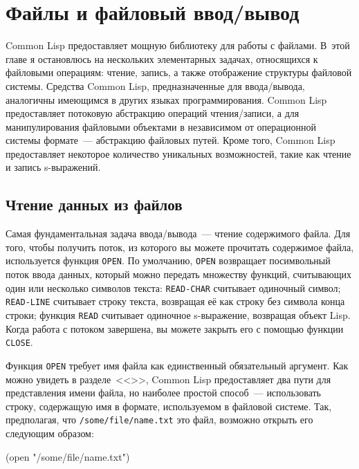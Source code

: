 \chapter{Файлы и файловый ввод/вывод}
\label{ch:14}

\thispagestyle{empty}

Common Lisp предоставляет мощную библиотеку для работы с файлами. В~этой главе я
остановлюсь на нескольких элементарных задачах, относящихся к файловыми операциям: чтение,
запись, а также отображение структуры файловой системы. Средства Common Lisp,
предназначенные для ввода/вывода, аналогичны имеющимся в других языках
программирования. Common Lisp предоставляет потоковую абстракцию операций чтения/записи, а
для манипулирования файловыми объектами в независимом от операционной системы формате~---
абстракцию файловых путей. Кроме того, Common Lisp предоставляет некоторое
количество уникальных возможностей, такие как чтение и запись s-выражений.

\section{Чтение данных из файлов}

Самая фундаментальная задача ввода/вывода~--- чтение содержимого файла. Для того, чтобы
получить поток, из которого вы можете прочитать содержимое файла, используется функция
\lstinline{OPEN}. По умолчанию, \lstinline{OPEN} возвращает посимвольный поток ввода данных, который
можно передать множеству функций, считывающих один или несколько символов текста:
\lstinline{READ-CHAR} считывает одиночный символ; \lstinline{READ-LINE} считывает строку текста,
возвращая её как строку без символа конца строки; функция \lstinline{READ} считывает одиночное
s-выражение, возвращая объект Lisp. Когда работа с потоком завершена, вы можете закрыть
его с помощью функции \lstinline{CLOSE}.

Функция \lstinline{OPEN} требует имя файла как единственный обязательный аргумент. Как можно
увидеть в разделе~<<>>, Common Lisp предоставляет два пути для представления
имени файла, но наиболее простой способ~--- использовать строку, содержащую имя в формате,
используемом в файловой системе. Так, предполагая, что \lstinline{/some/file/name.txt} это
файл, возможно открыть его следующим образом:

\begin{myverb}
(open "/some/file/name.txt")
\end{myverb}

